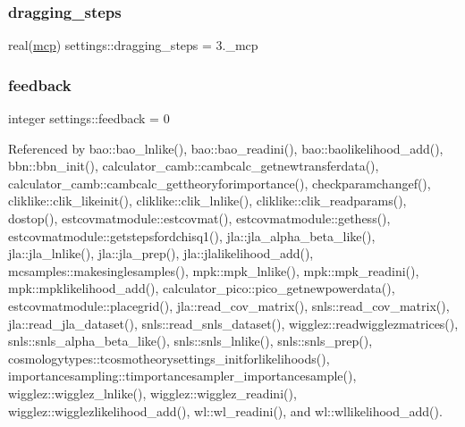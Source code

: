 \mbox{\label{namespacesettings_ab8364bc8c9e772b73f258e33676806ec}} 
\subsubsection{\texorpdfstring{dragging\+\_\+steps}{dragging\_steps}}
{\footnotesize\ttfamily real(\mbox{\hyperlink{namespacesettings_a341fa0fe410054f78630c33e118669bf}{mcp}}) settings\+::dragging\+\_\+steps = 3.\+\_\+mcp}

\mbox{\label{namespacesettings_a34e44606ac3e84f06e2696f74542f664}} 
\subsubsection{\texorpdfstring{feedback}{feedback}}
{\footnotesize\ttfamily integer settings\+::feedback = 0}



Referenced by bao\+::bao\+\_\+lnlike(), bao\+::bao\+\_\+readini(), bao\+::baolikelihood\+\_\+add(), bbn\+::bbn\+\_\+init(), calculator\+\_\+camb\+::cambcalc\+\_\+getnewtransferdata(), calculator\+\_\+camb\+::cambcalc\+\_\+gettheoryforimportance(), checkparamchangef(), cliklike\+::clik\+\_\+likeinit(), cliklike\+::clik\+\_\+lnlike(), cliklike\+::clik\+\_\+readparams(), dostop(), estcovmatmodule\+::estcovmat(), estcovmatmodule\+::gethess(), estcovmatmodule\+::getstepsfordchisq1(), jla\+::jla\+\_\+alpha\+\_\+beta\+\_\+like(), jla\+::jla\+\_\+lnlike(), jla\+::jla\+\_\+prep(), jla\+::jlalikelihood\+\_\+add(), mcsamples\+::makesinglesamples(), mpk\+::mpk\+\_\+lnlike(), mpk\+::mpk\+\_\+readini(), mpk\+::mpklikelihood\+\_\+add(), calculator\+\_\+pico\+::pico\+\_\+getnewpowerdata(), estcovmatmodule\+::placegrid(), jla\+::read\+\_\+cov\+\_\+matrix(), snls\+::read\+\_\+cov\+\_\+matrix(), jla\+::read\+\_\+jla\+\_\+dataset(), snls\+::read\+\_\+snls\+\_\+dataset(), wigglez\+::readwigglezmatrices(), snls\+::snls\+\_\+alpha\+\_\+beta\+\_\+like(), snls\+::snls\+\_\+lnlike(), snls\+::snls\+\_\+prep(), cosmologytypes\+::tcosmotheorysettings\+\_\+initforlikelihoods(), importancesampling\+::timportancesampler\+\_\+importancesample(), wigglez\+::wigglez\+\_\+lnlike(), wigglez\+::wigglez\+\_\+readini(), wigglez\+::wigglezlikelihood\+\_\+add(), wl\+::wl\+\_\+readini(), and wl\+::wllikelihood\+\_\+add().

